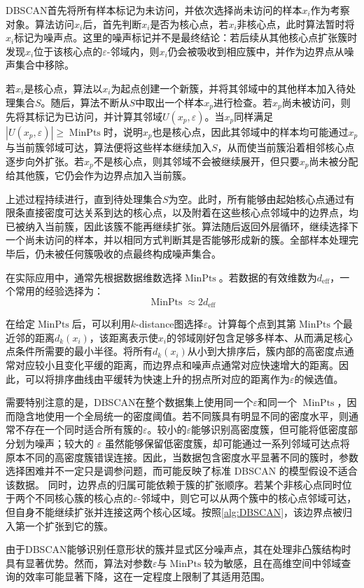 DBSCAN首先将所有样本标记为未访问，并依次选择尚未访问的样本$x_i$作为考察对象。算法访问$x_i$后，首先判断$x_i$是否为核心点，若$x_i$非核心点，此时算法暂时将$x_i$标记为噪声点。这里的噪声标记并不是最终结论：若后续从其他核心点扩张簇时发现$x_i$位于该核心点的$\varepsilon$-邻域内，则$x_i$仍会被吸收到相应簇中，并作为边界点从噪声集合中移除。\par
若$x_i$是核心点，算法以$x_i$为起点创建一个新簇，并将其邻域中的其他样本加入待处理集合$S$。随后，算法不断从$S$中取出一个样本$x_p$进行检查。若$x_p$尚未被访问，则先将其标记为已访问，并计算其邻域$U(x_p,\varepsilon)$。当$x_p$同样满足$|U(x_p,\varepsilon)|\geqslant\operatorname{MinPts}$时，说明$x_p$也是核心点，因此其邻域中的样本均可能通过$x_p$与当前簇邻域可达，算法便将这些样本继续加入$S$，从而使当前簇沿着相邻核心点逐步向外扩张。若$x_p$不是核心点，则其邻域不会被继续展开，但只要$x_p$尚未被分配给其他簇，它仍会作为边界点加入当前簇。\par
上述过程持续进行，直到待处理集合$S$为空。此时，所有能够由起始核心点通过有限条直接密度可达关系到达的核心点，以及附着在这些核心点邻域中的边界点，均已被纳入当前簇，因此该簇不能再继续扩张。算法随后返回外层循环，继续选择下一个尚未访问的样本，并以相同方式判断其是否能够形成新的簇。全部样本处理完毕后，仍未被任何簇吸收的点最终构成噪声集合。\par
\begin{note}
	在实际应用中，通常先根据数据维数选择$\operatorname{MinPts}$。若数据的有效维数为$d_{\mathrm{eff}}$，一个常用的经验选择为：
	\begin{equation*}
		\operatorname{MinPts}\approx
		2d_{\mathrm{eff}}
	\end{equation*}\par
	在给定$\operatorname{MinPts}$后，可以利用$k$-distance图选择$\varepsilon$。计算每个点到其第$\operatorname{MinPts}$个最近邻的距离$d_k(x_i)$，该距离表示使$x_i$的邻域刚好包含足够多样本、从而满足核心点条件所需要的最小半径。将所有$d_k(x_i)$从小到大排序后，簇内部的高密度点通常对应较小且变化平缓的距离，而边界点和噪声点通常对应快速增大的距离。因此，可以将排序曲线由平缓转为快速上升的拐点所对应的距离作为$\varepsilon$的候选值。\par
	需要特别注意的是，DBSCAN在整个数据集上使用同一个$\varepsilon$和同一个
	$\operatorname{MinPts}$，因而隐含地使用一个全局统一的密度阈值。若不同簇具有明显不同的密度水平，则通常不存在一个同时适合所有簇的$\varepsilon$。较小的$\varepsilon$能够识别高密度簇，但可能将低密度部分划为噪声；较大的 $\varepsilon$ 虽然能够保留低密度簇，却可能通过一系列邻域可达点将原本不同的高密度簇错误连接。因此，当数据包含密度水平显著不同的簇时，参数选择困难并不一定只是调参问题，而可能反映了标准 DBSCAN 的模型假设不适合该数据。
	同时，边界点的归属可能依赖于簇的扩张顺序。若某个非核心点同时位于两个不同核心簇的核心点的$\varepsilon$-邻域中，则它可以从两个簇中的核心点邻域可达，但自身不能继续扩张并连接这两个核心区域。按照\cref{alg:DBSCAN}，该边界点被归入第一个扩张到它的簇。
\end{note}
由于DBSCAN能够识别任意形状的簇并显式区分噪声点，其在处理非凸簇结构时具有显著优势。然而，算法对参数$\varepsilon$与$\operatorname{MinPts}$较为敏感，且在高维空间中邻域查询的效率可能显著下降，这在一定程度上限制了其适用范围。

